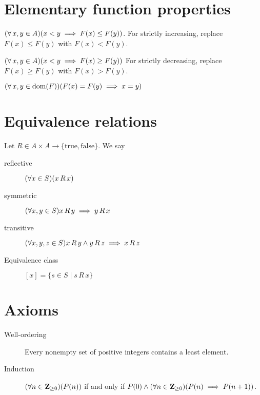 \documentclass[letterpaper,landscape,9pt,fleqn]{extarticle}
\newcommand{\dom}{\mathrm{dom}}
\newcommand{\integers}{\mathbf{Z}}
\DeclarePairedDelimiter{\parens}{\lparen}{\rparen}
\begin{document}
\begin{multicols*}{3}
\section*{Elementary function properties}
    \begin{description}[\itemsep=0em]
        \item[Increasing] \( \parens*{\forall \, x,y \in A} \parens*{x < y \implies F(x) \leq F(y)} \).
        For strictly increasing, replace $F(x) \leq F(y)$ with $F(x) < F(y)$.
        \item[Decreasing] \( \parens*{\forall \, x,y \in A} \parens*{x < y \implies F(x) \geq F(y)} \)
        For strictly decreasing, replace $F(x) \geq F(y)$ with $F(x) > F(y)$.
        \item[One-to-one] \( \parens*{\forall \, x,y \in \dom(F)} \parens*{F(x) = F(y) \implies x = y} \)
    \end{description}

\section*{Equivalence relations}
Let $R \in A \times A \to \{\mbox{true}, \mbox{false}\}$. We say
\begin{description}
    \item[reflective]  $\parens*{\forall x \in S} \parens*{x \, R \, x}$
    \item[symmetric] $\parens*{\forall x,y\in S} x \, R \, y \implies y \, R \, x$
    \item[transitive] $\parens*{\forall x,y,z\in S} x \, R \, y \land y \, R \, z
       \implies x \, R \, z$
\item[Equivalence class] $[x] = \{s \in S \mid s \, R \, x \}$
\end{description}

\section*{Axioms}
\begin{description}
      \item[Well-ordering]  Every nonempty set of positive integers 
        contains a least element.
    \item[Induction] $\parens*{\forall n \in \integers_{\geq 0}}(P(n))$ if and only if
    $ P(0) \land \parens*{\forall n \in 
    \integers_{\geq 0}}  \parens*{P(n) \implies P(n+1)}$.
\end{description}


\vfill
{}
\end{multicols*}%
\end{document}
